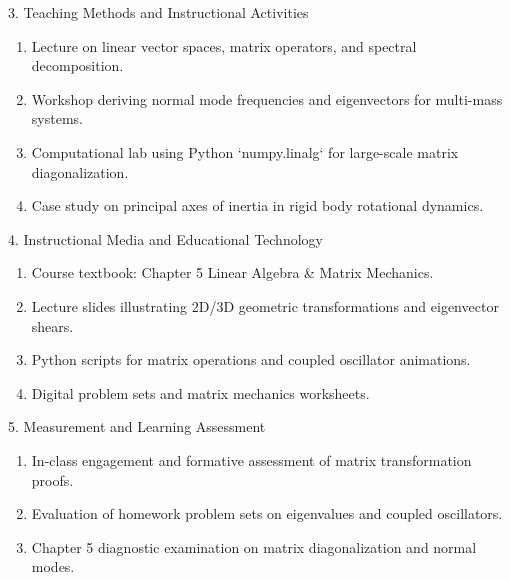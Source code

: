 \newpage

\begin{planbox}[colframe=rbruNavy!85!black, colbacktitle=rbruNavy!85!black]{3. Teaching Methods and Instructional Activities}
\begin{enumerate}[topsep=2pt, itemsep=1pt, partopsep=0pt, parsep=0pt, leftmargin=1.5em]
    \item Lecture on linear vector spaces, matrix operators, and spectral decomposition.
    \item Workshop deriving normal mode frequencies and eigenvectors for multi-mass systems.
    \item Computational lab using Python `numpy.linalg` for large-scale matrix diagonalization.
    \item Case study on principal axes of inertia in rigid body rotational dynamics.
\end{enumerate}
\end{planbox}

\begin{planbox}[colframe=rbruGold!90!black, colbacktitle=rbruGold!90!black]{4. Instructional Media and Educational Technology}
\begin{enumerate}[topsep=2pt, itemsep=1pt, partopsep=0pt, parsep=0pt, leftmargin=1.5em]
    \item Course textbook: Chapter 5 Linear Algebra \& Matrix Mechanics.
    \item Lecture slides illustrating 2D/3D geometric transformations and eigenvector shears.
    \item Python scripts for matrix operations and coupled oscillator animations.
    \item Digital problem sets and matrix mechanics worksheets.
\end{enumerate}
\end{planbox}

\begin{planbox}[colframe=rbruSlate, colbacktitle=rbruSlate]{5. Measurement and Learning Assessment}
\begin{enumerate}[topsep=2pt, itemsep=1pt, partopsep=0pt, parsep=0pt, leftmargin=1.5em]
    \item In-class engagement and formative assessment of matrix transformation proofs.
    \item Evaluation of homework problem sets on eigenvalues and coupled oscillators.
    \item Chapter 5 diagnostic examination on matrix diagonalization and normal modes.
\end{enumerate}
\end{planbox}
\clearpage

